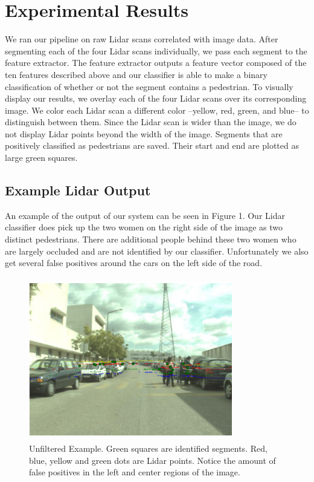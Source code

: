 \documentclass[10pt,twocolumn,letterpaper]{article}
\begin{document}
\section{Experimental Results}
  We ran our pipeline on raw Lidar scans correlated with image data. After
  segmenting each of the four Lidar scans individually, we pass each segment to the
  feature extractor. The feature extractor outputs a feature vector composed of
  the ten features described above and our classifier is able to make a binary
  classification of whether or not the segment contains a pedestrian. To visually
  display our results, we overlay each of the four Lidar scans over its corresponding
  image. We color each Lidar scan a different color --yellow, red, green, and blue--
  to distinguish between them. Since the Lidar scan is wider than the image,
  we do not display Lidar points beyond the width of the image. Segments that are
  positively classified as pedestrians are saved. Their start and end are plotted
  as large green squares.

  \subsection{Example Lidar Output}
  An example of the output of our system can be seen in Figure 1. Our Lidar
  classifier does pick up the two women on the right side of the image as two
  distinct pedestrians. There are additional people behind these two women
  who are largely occluded and are not identified by our classifier. Unfortunately
  we also get several false positives around the cars on the left side of the road.

  \begin{figure}
    \includegraphics[height=2.8in, width=3.5in]{images/filterSampleOriginal.png}
    \caption{ Unfiltered Example. Green squares are identified
    segments. Red, blue, yellow and green dots are Lidar points. Notice the
    amount of false positives in the left and center regions of the image.}
  \end{figure}
\end{document}
